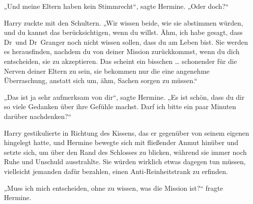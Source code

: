 „Und meine Eltern haben kein Stimmrecht“, sagte Hermine.
„Oder doch?“

Harry zuckte mit den Schultern.
„Wir wissen beide, wie sie abstimmen würden, und du kannst das berücksichtigen, wenn du willst. Ähm, ich habe gesagt, dass Dr~und Dr~Granger noch nicht wissen sollen, dass du am Leben bist. Sie werden es herausfinden, nachdem du von deiner Mission zurückkommst, wenn du dich entscheiden, sie zu akzeptieren. Das scheint ein bisschen … schonender für die Nerven deiner Eltern zu sein, sie bekommen nur die eine angenehme Überraschung, anstatt sich um, ähm, Sachen sorgen zu müssen.“

„Das ist ja sehr aufmerksam von dir“, sagte Hermine.
„Es ist schön, dass du dir so viele Gedanken über ihre Gefühle machst. Darf ich bitte ein paar Minuten darüber nachdenken?“

Harry gestikulierte in Richtung des Kissens, das er gegenüber von seinem eigenen hingelegt hatte, und Hermine bewegte sich mit fließender Anmut hinüber und setzte sich, um über den Rand des Schlosses zu blicken, während sie immer noch Ruhe und Unschuld ausstrahlte. Sie würden wirklich etwas dagegen tun müssen, vielleicht jemanden dafür bezahlen, einen Anti-Reinheitstrank zu erfinden.

„Muss ich mich entscheiden, ohne zu wissen, was die Mission ist?“ fragte Hermine.

